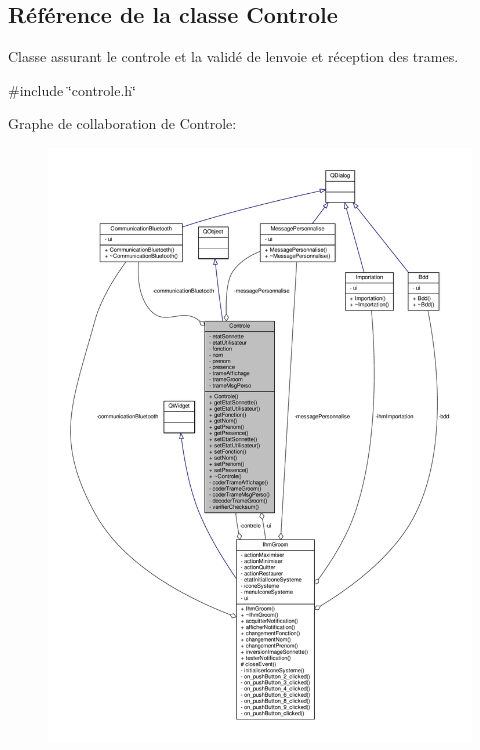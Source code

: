 \hypertarget{class_controle}{}\subsection{Référence de la classe Controle}
\label{class_controle}


Classe assurant le controle et la validé de l\textquotesingle{}envoie et réception des trames.  




{\ttfamily \#include \char`\"{}controle.\+h\char`\"{}}



Graphe de collaboration de Controle\+:
\nopagebreak
\begin{figure}[H]
\begin{center}
\leavevmode
\includegraphics[width=350pt]{class_controle__coll__graph}
\end{center}
\end{figure}

